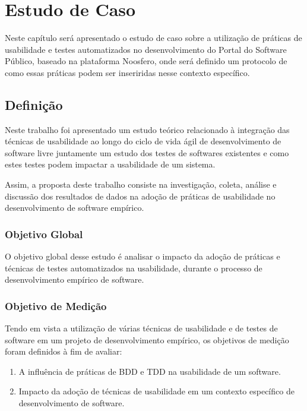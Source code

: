 \chapter{Estudo de Caso}



Neste capítulo será apresentado o estudo de caso sobre a utilização de práticas de usabilidade e testes automatizados no desenvolvimento do Portal do Software Público, baseado na plataforma Noosfero, onde será definido um protocolo de como essas práticas podem ser inseriridas nesse contexto específico.

\section{Definição}
Neste trabalho foi apresentado um estudo teórico relacionado à integração das técnicas de usabilidade ao longo do ciclo de vida ágil de desenvolvimento de software livre juntamente um estudo dos testes de softwares existentes e como estes testes podem impactar a usabilidade de um sistema.

Assim, a proposta deste trabalho consiste na investigação, coleta, análise e discussão dos resultados de dados na adoção de práticas de usabilidade no desenvolvimento de software empírico.

\subsection{Objetivo Global}

O objetivo global desse estudo é analisar o impacto da adoção de práticas e técnicas de testes automatizados na usabilidade, durante o processo de desenvolvimento empírico de software.


\subsection{Objetivo de Medição}

Tendo em vista a utilização de várias técnicas de usabilidade e de testes de software em um projeto de desenvolvimento empírico, os objetivos de medição foram definidos à fim de avaliar:

\begin{enumerate}
\item A influência de práticas de BDD e TDD na usabilidade de um software. 

\item Impacto da adoção de técnicas de usabilidade em um contexto específico de desenvolvimento de software.
\end{enumerate}


